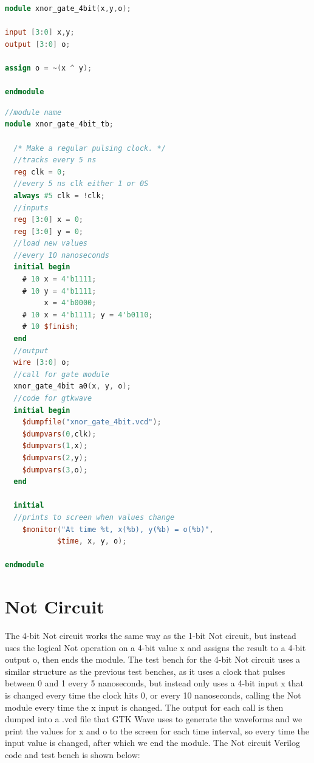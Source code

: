 \documentclass[runningheads, 12pt]{report}
\begin{document}
\begin{lstlisting}[language=Verilog, caption={Xnor Circuit Verilog}]
module xnor_gate_4bit(x,y,o);

input [3:0] x,y;
output [3:0] o;

assign o = ~(x ^ y);

endmodule
\end{lstlisting}


\begin{lstlisting}[language=Verilog, caption={Xnor Circuit Test Bench}]
//module name
module xnor_gate_4bit_tb;		

  /* Make a regular pulsing clock. */	
  //tracks every 5 ns
  reg clk = 0;
  //every 5 ns clk either 1 or 0S
  always #5 clk = !clk;	
  //inputs
  reg [3:0] x = 0;		
  reg [3:0] y = 0;
  //load new values
  //every 10 nanoseconds
  initial begin	
    # 10 x = 4'b1111;	
    # 10 y = 4'b1111;
    	 x = 4'b0000;	
    # 10 x = 4'b1111; y = 4'b0110;
    # 10 $finish;
  end
  //output
  wire [3:0] o;	
  //call for gate module
  xnor_gate_4bit a0(x, y, o);	
  //code for gtkwave
  initial begin	
    $dumpfile("xnor_gate_4bit.vcd");
    $dumpvars(0,clk);
    $dumpvars(1,x);
    $dumpvars(2,y);
    $dumpvars(3,o);
  end
  
  initial 				
  //prints to screen when values change
    $monitor("At time %t, x(%b), y(%b) = o(%b)",  
    		$time, x, y, o);   
    									
endmodule 
\end{lstlisting}

	
	\section{Not Circuit}
	
	The 4-bit Not circuit works the same way as the 1-bit Not circuit, but instead uses the logical Not operation on a 4-bit value x and assigns the result to a 4-bit output o, then ends the module. The test bench for the 4-bit Not circuit uses a similar structure as the previous test benches, as it uses a clock that pulses between 0 and 1 every 5 nanoseconds, but instead only uses a 4-bit input x that is changed every time the clock hits 0, or every 10 nanoseconds, calling the Not module every time the x input is changed. The output for each call is then dumped into a .vcd file that GTK Wave uses to generate the waveforms and we print the values for x and o to the screen for each time interval, so every time the input value is changed, after which we end the module. The Not circuit Verilog code and test bench is shown below: 
	
\end{document}
